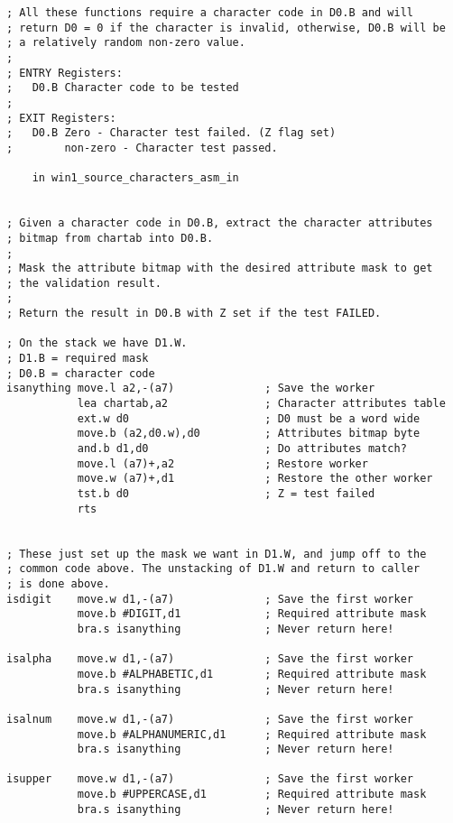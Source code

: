 \begin{lstlisting}[caption={Character attributes library - \protect\url{charAttr_asm_in}}]
; All these functions require a character code in D0.B and will
; return D0 = 0 if the character is invalid, otherwise, D0.B will be 
; a relatively random non-zero value.
;
; ENTRY Registers:
;   D0.B Character code to be tested
;
; EXIT Registers:
;   D0.B Zero - Character test failed. (Z flag set)
;        non-zero - Character test passed.

    in win1_source_characters_asm_in
    

; Given a character code in D0.B, extract the character attributes
; bitmap from chartab into D0.B.
;
; Mask the attribute bitmap with the desired attribute mask to get
; the validation result.
;
; Return the result in D0.B with Z set if the test FAILED.

; On the stack we have D1.W.
; D1.B = required mask
; D0.B = character code
isanything move.l a2,-(a7)              ; Save the worker
           lea chartab,a2               ; Character attributes table 
           ext.w d0                     ; D0 must be a word wide
           move.b (a2,d0.w),d0          ; Attributes bitmap byte
           and.b d1,d0                  ; Do attributes match?
           move.l (a7)+,a2              ; Restore worker
           move.w (a7)+,d1              ; Restore the other worker
           tst.b d0                     ; Z = test failed
           rts


; These just set up the mask we want in D1.W, and jump off to the
; common code above. The unstacking of D1.W and return to caller
; is done above.
isdigit    move.w d1,-(a7)              ; Save the first worker
           move.b #DIGIT,d1             ; Required attribute mask
           bra.s isanything             ; Never return here!

isalpha    move.w d1,-(a7)              ; Save the first worker
           move.b #ALPHABETIC,d1        ; Required attribute mask
           bra.s isanything             ; Never return here!

isalnum    move.w d1,-(a7)              ; Save the first worker
           move.b #ALPHANUMERIC,d1      ; Required attribute mask
           bra.s isanything             ; Never return here!

isupper    move.w d1,-(a7)              ; Save the first worker
           move.b #UPPERCASE,d1         ; Required attribute mask
           bra.s isanything             ; Never return here!


\end{lstlisting}
